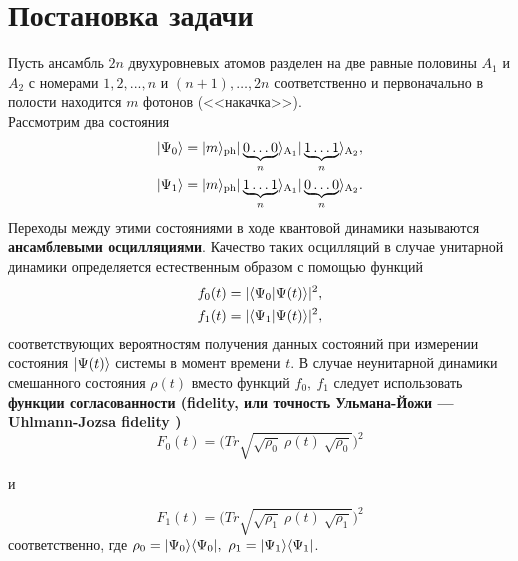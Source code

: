 \section{Постановка задачи}\label{sec:ch1/sec1}
\vspace{-1em}
\noindent Пусть ансамбль $2n$ двухуровневых атомов разделен на две равные половины $A_1$ и $A_2$ с номерами $1,2,...,n$ и $(n+1),\dots,2n$ соответственно и первоначально в полости находится $m$ фотонов (<<накачка>>).
\\[12pt]
Рассмотрим два состояния
\begin{equation}\label{main}
	\begin{split}
		|\Psi_0\rangle=|m\rangle_{\mathrm{ph}}|\protect\underbrace{0\dots0}_{n}\rangle_{\mathrm{A_{1}}} |\protect\underbrace{1\dots1}_{n}\rangle_{\mathrm{A_{2}}},\\
		|\Psi_1\rangle=|m\rangle_{\mathrm{ph}}|\protect\underbrace{1\dots1}_{n}\rangle_{\mathrm{A_{1}}} |\protect\underbrace{0\dots0}_{n}\rangle_{\mathrm{A_{2}}}.
	\end{split}
\end{equation}
Переходы между этими состояниями в ходе квантовой динамики называются \textbf{ансамблевыми осцилляциями}. Качество таких осцилляций в случае унитарной динамики определяется естественным образом с помощью функций 
\begin{equation}
	\begin{split}
		\displaystyle f_0(t)=|\langle \Psi_0 |\Psi(t)\rangle |^2,\\f_1(t)=|\langle \Psi_1 |\Psi(t)\rangle |^2,
	\end{split}
\end{equation}
соответствующих вероятностям получения данных состояний при измерении состояния $|\Psi(t)\rangle$ системы в момент времени $t$. В случае неунитарной динамики смешанного состояния $\rho(t)$ вместо функций $f_0, \ f_1$ следует использовать \textbf{функции согласованности (fidelity, или точность Ульмана-Йожи --- Uhlmann-Jozsa fidelity \cite{fidelity_1,fidelity_2,fidelity_3,fidelity_4})}
\begin{equation}
F_0(t)=\biggl(Tr\sqrt{\sqrt{\rho_0}\ \rho(t)\ \sqrt{\rho_0}}\biggr)^{2}
\end{equation}
\begin{center}и\end{center}
\begin{equation}
F_1(t)=\biggl(Tr\sqrt{\sqrt{\rho_1}\ \rho(t)\ \sqrt{\rho_1}}\biggr)^{2}
\end{equation}
соответственно, где $\rho_0=|\Psi_0\ra\la\Psi_0|,\ \rho_1=|\Psi_1\ra\la\Psi_1|$. 

